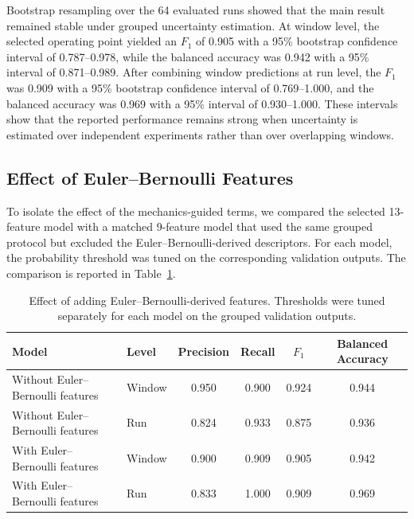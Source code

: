 \documentclass[notspecified,article,submit,pdftex,moreauthors]{Definitions/mdpi}
\begin{document}
Bootstrap resampling over the 64 evaluated runs showed that the main result remained stable under grouped uncertainty estimation. At window level, the selected operating point yielded an $F_1$ of 0.905 with a 95\% bootstrap confidence interval of 0.787--0.978, while the balanced accuracy was 0.942 with a 95\% interval of 0.871--0.989. After combining window predictions at run level, the $F_1$ was 0.909 with a 95\% bootstrap confidence interval of 0.769--1.000, and the balanced accuracy was 0.969 with a 95\% interval of 0.930--1.000. These intervals show that the reported performance remains strong when uncertainty is estimated over independent experiments rather than over overlapping windows.

\subsection{Effect of Euler--Bernoulli Features}

To isolate the effect of the mechanics-guided terms, we compared the selected 13-feature model with a matched 9-feature model that used the same grouped protocol but excluded the Euler--Bernoulli-derived descriptors. For each model, the probability threshold was tuned on the corresponding validation outputs. The comparison is reported in Table~\ref{tab:physics_effect}.

\begin{table}[H]
\caption{Effect of adding Euler--Bernoulli-derived features. Thresholds were tuned separately for each model on the grouped validation outputs.\label{tab:physics_effect}}
\setlength{\tabcolsep}{4pt}
\begin{tabular*}{\textwidth}{@{\extracolsep{\fill}}>{\raggedright\arraybackslash}p{}lcccc}
\toprule
\textbf{Model} & \textbf{Level} & \textbf{Precision} & \textbf{Recall} & \textbf{$F_1$} & \textbf{Balanced Accuracy} \\
\midrule
Without Euler--Bernoulli features & Window & 0.950 & 0.900 & 0.924 & 0.944 \\
Without Euler--Bernoulli features & Run & 0.824 & 0.933 & 0.875 & 0.936 \\
With Euler--Bernoulli features & Window & 0.900 & 0.909 & 0.905 & 0.942 \\
With Euler--Bernoulli features & Run & 0.833 & 1.000 & 0.909 & 0.969 \\
\bottomrule
\end{tabular*}
\end{table}
\end{document}
